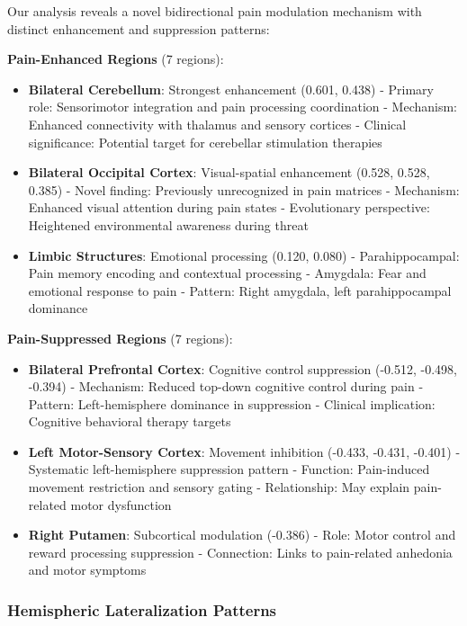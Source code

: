 \documentclass[10pt,journal,compsoc]{IEEEtran}
\begin{document}
Our analysis reveals a novel bidirectional pain modulation mechanism with distinct enhancement and suppression patterns:

\textbf{Pain-Enhanced Regions} (7 regions):
\begin{itemize}
\item \textbf{Bilateral Cerebellum}: Strongest enhancement (0.601, 0.438)
  - Primary role: Sensorimotor integration and pain processing coordination
  - Mechanism: Enhanced connectivity with thalamus and sensory cortices
  - Clinical significance: Potential target for cerebellar stimulation therapies

\item \textbf{Bilateral Occipital Cortex}: Visual-spatial enhancement (0.528, 0.528, 0.385)  
  - Novel finding: Previously unrecognized in pain matrices
  - Mechanism: Enhanced visual attention during pain states
  - Evolutionary perspective: Heightened environmental awareness during threat

\item \textbf{Limbic Structures}: Emotional processing (0.120, 0.080)
  - Parahippocampal: Pain memory encoding and contextual processing
  - Amygdala: Fear and emotional response to pain
  - Pattern: Right amygdala, left parahippocampal dominance
\end{itemize}

\textbf{Pain-Suppressed Regions} (7 regions):
\begin{itemize}
\item \textbf{Bilateral Prefrontal Cortex}: Cognitive control suppression (-0.512, -0.498, -0.394)
  - Mechanism: Reduced top-down cognitive control during pain
  - Pattern: Left-hemisphere dominance in suppression
  - Clinical implication: Cognitive behavioral therapy targets

\item \textbf{Left Motor-Sensory Cortex}: Movement inhibition (-0.433, -0.431, -0.401)
  - Systematic left-hemisphere suppression pattern
  - Function: Pain-induced movement restriction and sensory gating
  - Relationship: May explain pain-related motor dysfunction

\item \textbf{Right Putamen}: Subcortical modulation (-0.386)
  - Role: Motor control and reward processing suppression
  - Connection: Links to pain-related anhedonia and motor symptoms
\end{itemize}

\subsubsection{Hemispheric Lateralization Patterns}
\end{document}
